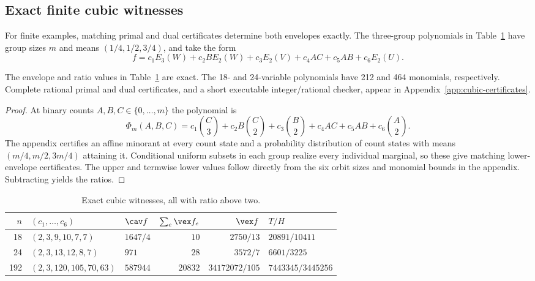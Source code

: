 \subsection{Exact finite cubic witnesses}
For finite examples, matching primal and dual certificates determine both
envelopes exactly. The three-group
polynomials in Table~\ref{tab:cubic-finite} have group sizes $m$ and
means $(1/4,1/2,3/4)$, and take the form
\begin{equation}\label{eq:cubic-six-family}
 f=c_1E_3(W)+c_2B E_2(W)+c_3E_2(V)+c_4AC+c_5AB+c_6E_2(U).
\end{equation}

\begin{proposition}\label{prop:cubic-finite}
The envelope and ratio values in Table~\ref{tab:cubic-finite} are exact.
The 18- and 24-variable polynomials have 212 and 464 monomials,
respectively. Complete rational primal and dual certificates, and a
short executable integer/rational checker, appear in
Appendix~\ref{app:cubic-certificates}.
\end{proposition}
\begin{proof}
At binary counts $A,B,C\in\{0,\ldots,m\}$ the polynomial is
\[
 \Phi_m(A,B,C)=c_1\binom C3+c_2B\binom C2+c_3\binom B2
              +c_4AC+c_5AB+c_6\binom A2.
\]
The appendix certifies an affine minorant at every count state and a
probability distribution of count states with means $(m/4,m/2,3m/4)$
attaining it. Conditional uniform subsets in each group realize every
individual marginal, so these give matching lower-envelope certificates.
The upper and termwise lower values follow directly from the six orbit
sizes and monomial bounds in the appendix. Subtracting yields the ratios.
\end{proof}

\begin{table}[htbp]
\centering\small
\begin{tabular}{rllrrl}
\toprule
$n$&$(c_1,\ldots,c_6)$&$\cav f$&$\sum_e\vex f_e$&$\vex f$&$T/H$\\\midrule
18&$(2,3,9,10,7,7)$&$1647/4$&$10$&$2750/13$&$20891/10411$\\
24&$(2,3,13,12,8,7)$&$971$&$28$&$3572/7$&$6601/3225$\\
192&$(2,3,120,105,70,63)$&$587944$&$20832$&$34172072/105$&$7443345/3445256$\\\bottomrule
\end{tabular}
\caption{Exact cubic witnesses, all with ratio above two.}
\label{tab:cubic-finite}
\end{table}

